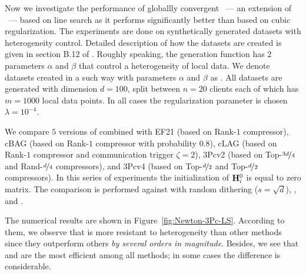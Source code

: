 \documentclass[11pt]{article}
\begin{document}
	
	Now we investigate the performance of globallly convergent ~--- an extension of ~--- based on line search as it performs significantly better than  based on cubic regularization. The experiments are done on synthetically generated datasets with heterogeneity control. Detailed description of how the datasets are created is given in  section B.12 of \citep{FedNL2021}. Roughly speaking, the generation function has $2$ parameters $\alpha$ and $\beta$ that control a heterogeneity of local data. We denote datasets created in a such way with parameters $\alpha$ and $\beta$ as . All datasets are generated with dimension $d=100$, split between $n=20$ clients each of which has $m=1000$ local data points. In all cases the regularization parameter is chosen $\lambda=10^{-4}$.
	
	We compare $5$ versions of  combined with EF21 (based on Rank-$1$ compressor), cBAG (based on Rank-$1$ compressor with probability $0.8$), cLAG (based on Rank-$1$ compressor and communication trigger $\zeta=2$), 3Pcv2 (based on Top-$\nicefrac{3d}{4}$ and Rand-$\nicefrac{d}{4}$ compressors), and 3Pcv4 (based on Top-$\nicefrac{d}{2}$ and Top-$\nicefrac{d}{2}$ compressors). In this series of experiments the initialization of $\mathbf{H}^0_i$ is equal to zero matrix. The comparison is performed against  \citep{ADIANA} with random dithering ($s=\sqrt{d}$),  \citep{IOSFabbro2022}, and  \citep{GIANT2018}. 
	
	The numerical results are shown in Figure~\ref{fig:Newton-3Pc-LS}. According to them, we observe that  is more resistant to heterogeneity than other methods since they outperform others {\it by several orders in magnitude}. Besides, we see that  and  are the most efficient among all  methods; in some cases the difference is considerable.
	
\end{document}
